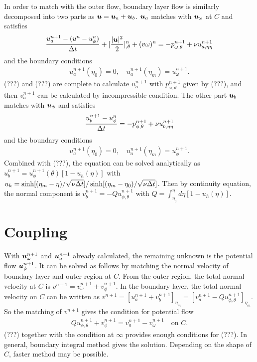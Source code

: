 In order to match with the outer flow, boundary layer flow is similarly decomposed into two parts as $\boldsymbol{u} = \boldsymbol{u}_a + \boldsymbol{u}_b$.
$\boldsymbol{u}_a$ matches with $\boldsymbol{u}_\omega$ at $C$ and satisfies
\begin{align} \label{eqn:ua}
\frac{u_a^{n+1}-(u^n-u_\phi^n) }{\Delta t}  + [\frac{|\boldsymbol{u}|^2}{2}]^n_{,\theta} + (v \omega)^n
 =   -p^{n+1}_{\omega,\theta} + \nu u^{n+1}_{a,\eta\eta}
\end{align}
and the boundary conditions
\begin{align} \label{eqn:uaBC}
u_a^{n+1}(\eta_0) = 0, \quad u_a^{n+1}(\eta_m) = u_\omega^{n+1}.
\end{align}
(???) and (???) are complete to calculate $u_a^{n+1}$ with $p_{\omega, \theta}^{n+1}$ given by (???), and then $v_a^{n+1}$ can be calculated by incompressible condition.
The other part $\boldsymbol{u}_b$ matches with $\boldsymbol{u}_\phi$ and satisfies
\begin{align} \label{eqn:ub}
\frac{u_b^{n+1}- u_\phi^n }{\Delta t} =   -p^{n+1}_{\phi,\theta} + \nu u^{n+1}_{b,\eta\eta}
\end{align}
and the boundary conditions
\begin{align} \label{eqn:ubBC}
u_a^{n+1}(\eta_0) = 0, \quad u_a^{n+1}(\eta_m) = u_\phi^{n+1}.
\end{align}
Combined with (???), the equation can be solved analytically as  $u_b^{n+1} = u_{\phi}^{n+1}(\theta) [1- u_h(\eta)] $ with $u_h = \sinh[(\eta_m - \eta)/\sqrt{\nu \Delta t}] / \sinh[(\eta_m - \eta_0)/\sqrt{\nu \Delta t}]$. Then by continuity equation, the normal component is $v_b^{n+1} = -Q u_{\phi,\theta}^{n+1}$ with $Q = \int_{\eta_0}^{\eta} d\eta [1 - u_h(\eta)]$.


\section{Coupling}

With $\boldsymbol{u}_\omega^{n+1}$ and $\boldsymbol{u}_a^{n+1}$ already calculated, the remaining unknown is the potential flow $\boldsymbol{u}_{\phi}^{n+1}$. 
It can be solved as follows by matching the normal velocity of boundary layer and outer region at $C$.
From the outer region, the total normal velocity at $C$ is $v^{n+1} = v_\omega^{n+1} + v_\phi^{n+1}$.
In the boundary layer, the total normal velocity on $C$ can be written as $v^{n+1} = [u_a^{n+1} + v_b^{n+1}]_{\eta_m}  = [ v_a^{n+1}  - Q u_{\phi, \theta}^{n+1}]_{\eta_m}$.
So the matching of $v^{n+1}$ gives the condition for potential flow
\begin{align} \label{eqn:matching}
Q u_{\phi, \theta}^{n+1} + v_{\phi}^{n+1} = v_a^{n+1} - v_\omega^{n+1} \quad \text{on~} C.
\end{align}
(???) together with the condition at $\infty$ provides enough conditions for (???). In general, boundary integral method gives the solution.
Depending on the shape of $C$, faster method may be possible.

